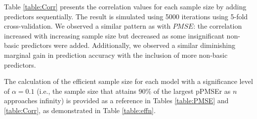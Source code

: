 Table \ref{table:Corr} presents the correlation values for each sample size by adding predictors sequentially. The result is simulated using 5000 iterations using 5-fold cross-validation. We observed a similar pattern as with $PMSE$: the correlation increased with increasing sample size but decreased as some insignificant non-basic predictors were added. Additionally, we observed a similar diminishing marginal gain in prediction accuracy with the inclusion of more non-basic predictors.



The calculation of the efficient sample size for each model with a significance level of $\alpha = 0.1$ (i.e., the sample size that attains 90\% of the largest pPMSEr as $n$ approaches infinity) is provided as a reference in Tables \ref{table:PMSE} and \ref{table:Corr}, as demonstrated in Table \ref{table:effn}.


\begin{table}
\centering
{}
\caption{Efficient sample size $n^*$ by sequentially added predictors over the basic 3 predictors}
 \label{table:effn}
\end{table}

